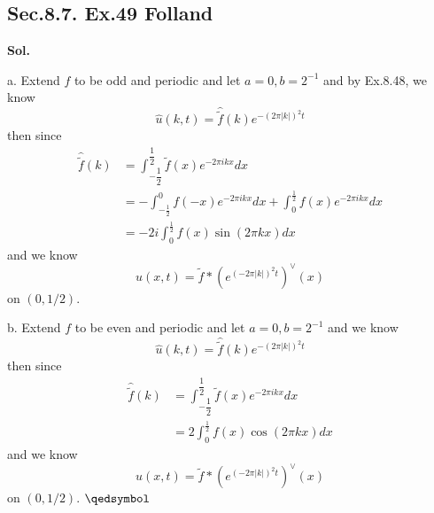 \documentclass[lang=en,11pt,a4paper,citestyle =authoryear]{elegantpaper}
\newcommand{\prvd}{$\hfill \qedsymbol$}
\begin{document}
\subsection*{Sec.8.7. Ex.49 Folland} 
\textbf{Sol.} \par
a. Extend $f$ to be odd and periodic and let $a=0,b=2^{-1}$ and by Ex.8.48, we know
\[  
\hat{u}(k,t) = \widehat{\tilde{f}}(k)e^{-(2\pi|k|)^2 t}
\]
then since
\[
\begin{aligned}
\widehat{\tilde{f}}(k) &= \int_{-\dfrac{1}{2}}^{\dfrac{1}{2}} \tilde{f}(x)e^{-2\pi i kx} dx\\ &=-\int^0_{-\tfrac{1}{2}} f(-x)e^{-2\pi i kx} dx + \int_0^{\tfrac{1}{2}} f(x)e^{-2\pi i kx} dx \\ &= - 2i\int_0^{\tfrac{1}{2}} f(x)\sin(2\pi k x) dx
\end{aligned}
\]
and we know
\[
u(x,t) = \tilde{f}*(e^{(-2\pi|k|)^2 t})^{\vee}(x)
\]
on $(0,1/2)$.\par
b. Extend $f$ to be even and periodic and let $a=0,b=2^{-1}$ and we know
\[
\hat{u}(k,t) = \widehat{\tilde{f}}(k)e^{-(2\pi|k|)^2 t}
\]
then since
\[
\begin{aligned}
\widehat{\tilde{f}}(k) &= \int_{-\dfrac{1}{2}}^{\dfrac{1}{2}} \tilde{f}(x)e^{-2\pi i kx} dx \\ &= 2\int_0^{\tfrac{1}{2}} f(x)\cos(2\pi k x) dx
\end{aligned}
\]
and we know
\[
u(x,t) = \tilde{f}*(e^{(-2\pi|k|)^2 t})^{\vee}(x)
\]
on $(0,1/2)$.
\prvd
\end{document}
